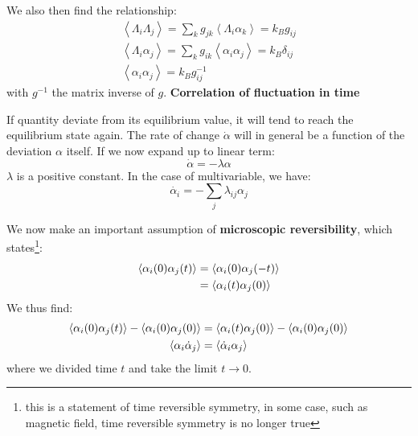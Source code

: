 \documentclass{article}
\begin{document}
We also then find the relationship:
\begin{gather}
    \left\langle \Lambda_i \Lambda_j \right\rangle = \sum_k g_{jk} \left\langle \Lambda_i \alpha_k \right\rangle 
    = k_B g_{ij} \\
    \left\langle \Lambda_i \alpha_j \right\rangle = \sum_k g_{ik} \left\langle \alpha_i \alpha_j \right\rangle 
    = k_B \delta_{ij} \\
    \left\langle \alpha_i \alpha_j \right\rangle = k_B g^{-1}_{ij}
\end{gather}
with $g^{-1}$ the matrix inverse of $g$. 
\newline
\textbf{Correlation of fluctuation in time} 

If quantity deviate from its equilibrium value, it will tend to reach 
the equilibrium state again. The rate of change $\dot{\alpha}$ will in general 
be a function of the deviation $\alpha$ itself. 
If we now expand up to linear term:
\begin{equation}
    \dot{\alpha} = - \lambda \alpha
\end{equation}
$\lambda$ is a positive constant. In the case of multivariable, we 
have:
\begin{equation}
    \dot{\alpha_i} = - \sum_{j} \lambda_{ij} \alpha_j  \label{recover}
\end{equation}

We now make an important assumption of \textbf{microscopic reversibility}, which 
states\footnote{this is a statement of time reversible symmetry, in some case, such as 
magnetic field, time reversible symmetry is no longer true}:
\begin{align}
    \langle \alpha_i(0)\alpha_j(t) \rangle &= 
    \langle \alpha_i(0)\alpha_j(-t) \rangle \notag \\ 
    &= \langle \alpha_i(t)\alpha_j(0) \rangle
\end{align}
We thus find:
\begin{gather}
    \langle \alpha_i(0)\alpha_j(t) \rangle - \langle \alpha_i(0)\alpha_j(0) \rangle  
    = \langle \alpha_i(t)\alpha_j(0) \rangle - \langle \alpha_i(0)\alpha_j(0) \rangle   \notag \\
    \langle \alpha_i \dot{\alpha}_j \rangle = \langle \dot{\alpha}_i \alpha_j \rangle \label{microreverse}
\end{gather}
where we divided time $t$ and take the limit $t \to 0$.
\end{document}
